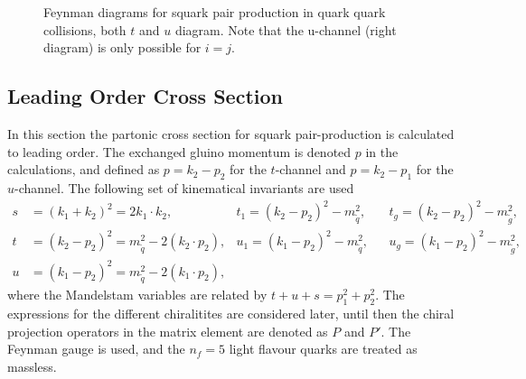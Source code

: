 \documentclass[twoside,english]{uiofysmaster}
\begin{document}
\begin{figure}
\centering
{}
\caption{Feynman diagrams for squark pair production in quark quark collisions, both $t$ and $u$ diagram. Note that the u-channel (right diagram) is only possible for $i=j$.}
\label{Fig:: susy hadron : Feynman qq}
\end{figure}



\subsection{Leading Order Cross Section}

In this section the partonic cross section for squark pair-production is calculated to leading order. The exchanged gluino momentum is denoted $p$ in the calculations, and defined as $p= k_2-p_2 $ for the $t$-channel and $p=k_2-p_1$ for the $u$-channel. The following set of kinematical invariants are used
\begin{align*}
s &= (k_1 + k_2)^2 = 2 k_1 \cdot k_2, &t_1 = (k_2-p_2)^2 - m_{\tilde{q}}^2, &&t_g = (k_2-p_2)^2 - m_{\tilde{g}}^2,\\
t &= (k_2-p_2)^2 = m_{\tilde{q}}^2 - 2 (k_2 \cdot p_2), &u_1 = (k_1-p_2)^2 - m_{\tilde{q}}^2, &&u_g = (k_1-p_2)^2 - m_{\tilde{g}}^2,\\
u &= (k_1 - p_2)^2 = m_{\tilde{q}}^2 - 2 (k_1 \cdot p_2),
\end{align*}
where the Mandelstam variables are related by $t + u+ s = p_1^2 + p_2^2$. The expressions for the different chiralitites are considered later, until then the chiral projection operators in the matrix element are denoted as $P$ and $P'$. The Feynman gauge is used, and the $n_f = 5$ light flavour quarks are treated as massless. 
\end{document}
